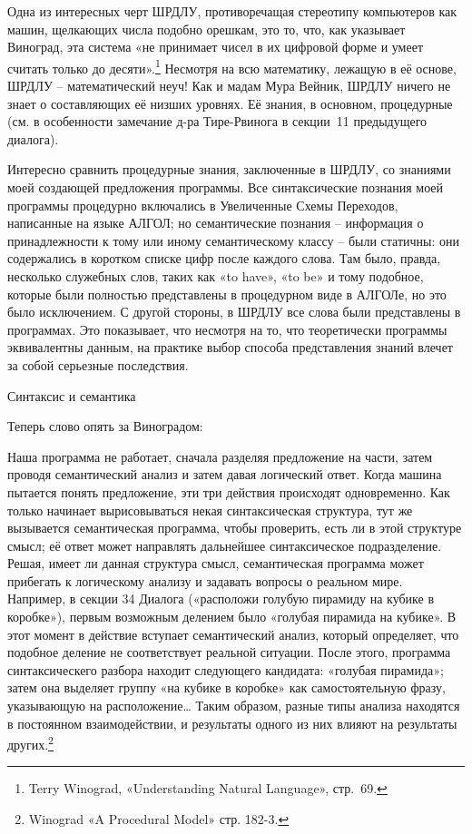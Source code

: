 \documentclass[../main.tex]{subfiles}
\begin{document}
Одна из интересных черт ШРДЛУ, противоречащая стереотипу компьютеров как машин, щелкающих числа подобно орешкам, это то, что, как указывает Виноград, эта система «не принимает чисел в их цифровой форме и умеет считать только до десяти».\footnote{Terry Winograd, «Understanding Natural Language», стр.~69.} Несмотря на всю математику, лежащую в её основе, ШРДЛУ \--- математический неуч! Как и мадам Мура Вейник, ШРДЛУ ничего не знает о составляющих её низших уровнях. Её знания, в основном, процедурные (см. в особенности замечание д-ра Тире-Рвинога в секции~11 предыдущего диалога).

Интересно сравнить процедурные знания, заключенные в ШРДЛУ, со знаниями моей создающей предложения программы. Все синтаксические познания моей программы процедурно включались в Увеличенные Схемы Переходов, написанные на языке АЛГОЛ; но семантические познания \--- информация о принадлежности к тому или иному семантическому классу \--- были статичны: они содержались в коротком списке цифр после каждого слова. Там было, правда, несколько служебных слов, таких как «to have», «to be» и тому подобное, которые были полностью представлены в процедурном виде в АЛГОЛе, но это было исключением. С другой стороны, в ШРДЛУ все слова были представлены в программах. Это показывает, что несмотря на то, что теоретически программы эквивалентны данным, на практике выбор способа представления знаний влечет за собой серьезные последствия.

Синтаксис и семантика

Теперь слово опять за Виноградом:

Наша программа не работает, сначала разделяя предложение на части, затем проводя семантический анализ и затем давая логический ответ. Когда машина пытается понять предложение, эти три действия происходят одновременно. Как только начинает вырисовываться некая синтаксическая структура, тут же вызывается семантическая программа, чтобы проверить, есть ли в этой структуре смысл; её ответ может направлять дальнейшее синтаксическое подразделение. Решая, имеет ли данная структура смысл, семантическая программа может прибегать к логическому анализу и задавать вопросы о реальном мире. Например, в секции 34 Диалога («расположи голубую пирамиду на кубике в коробке»), первым возможным делением было «голубая пирамида на кубике». В этот момент в действие вступает семантический анализ, который определяет, что подобное деление не соответствует реальной ситуации. После этого, программа синтаксическего разбора находит следующего кандидата: «голубая пирамида»; затем она выделяет группу «на кубике в коробке» как самостоятельную фразу, указывающую на расположение\ldots{} Таким образом, разные типы анализа находятся в постоянном взаимодействии, и результаты одного из них влияют на результаты других.\footnote{Winograd «A Procedural Model» стр. 182-3.}
\end{document}
